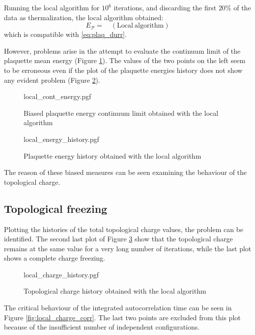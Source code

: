 Running the local algorithm for $10^6$ iterations, and discarding the first $20\%$ of the data as thermalization, the local algorithm obtained:
\begin{equation}\label{eq:plaq_local}
    E_{\mathcal P} =  \quad \mathrm{(Local\ algorithm)}
\end{equation}
which is compatible with \eqref{eq:plaq_durr}.

However, problems arise in the attempt to evaluate the continuum limit of the plaquette mean energy (Figure \ref{fig:local_cont_energy}).
The values of the two points on the left seem to be erroneous even if the plot of the plaquette energies history
does not show any evident problem (Figure \ref{fig:local_energy_history}).

\begin{figure}[!htb]
    \centering
    {local_cont_energy.pgf}
    \caption{Biased plaquette energy continuum limit obtained with the local algorithm}
    \label{fig:local_cont_energy}
\end{figure}

\begin{figure}[!htb]
    \centering
    {local_energy_history.pgf}
    \caption{Plaquette energy history obtained with the local algorithm}
    \label{fig:local_energy_history}
\end{figure}

The reason of these biased measures can be seen examining the behaviour of the topological charge.

\subsection*{Topological freezing}

Plotting the histories of the total topological charge values, the problem can be identified.
The second last plot of Figure \ref{fig:local_charge_history} show that the topological charge remains at the same value for a very long number of iterations,
while the last plot shows a complete charge freezing.

\begin{figure}[!htb]
    \centering
    {local_charge_history.pgf}
    \caption{Topological charge history obtained with the local algorithm}
    \label{fig:local_charge_history}
\end{figure}

The critical behaviour of the integrated autocorrelation time can be seen in Figure \ref{fig:local_charge_corr}.
The last two points are excluded from this plot because of the insufficient number of independent configurations.

